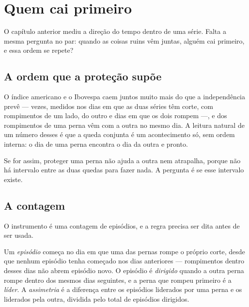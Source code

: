\chapter{Quem cai primeiro}\label{cap:primeiro}

O capítulo anterior mediu a direção do tempo dentro de uma série. Falta a mesma pergunta no par:
quando as coisas ruins vêm juntas, alguém cai primeiro, e essa ordem se repete?

\section{A ordem que a proteção supõe}

O índice americano e o Ibovespa caem juntos muito mais do que a independência prevê ---
\numConjuntaExcesso{} vezes, medidos nos \numConjuntaDias{} dias em que as duas séries têm corte, com
\numConjuntaRompeA{} rompimentos de um lado, \numConjuntaRompeB{} do outro e \numConjuntaJuntos{} dias
em que os dois rompem ---, e \numConjuntaAcompanhados{} dos rompimentos de uma perna vêm com a outra
no mesmo dia. A leitura
natural de um número desses é que a queda conjunta é um acontecimento só, sem ordem interna: o dia
de uma perna encontra o dia da outra e pronto.

Se for assim, proteger uma perna não ajuda a outra nem atrapalha, porque não há intervalo entre as
duas quedas para fazer nada. A pergunta é se esse intervalo existe.

\section{A contagem}

O instrumento é uma contagem de episódios, e a regra precisa ser dita antes de ser usada.

\begin{definicao}\label{def:episodio}
Um \emph{episódio} começa no dia em que uma das pernas rompe o próprio corte, desde que nenhum
episódio tenha começado nos \numConjuntaJanelaEpisodio{} dias anteriores --- rompimentos dentro
desses dias não abrem episódio novo. O episódio é \emph{dirigido} quando a outra perna rompe dentro
dos mesmos \numConjuntaJanelaEpisodio{} dias seguintes, e a perna que rompeu primeiro é a
\emph{líder}. A \emph{assimetria} é a diferença entre os episódios liderados por uma perna e os
liderados pela outra, dividida pelo total de episódios dirigidos.
\end{definicao}

